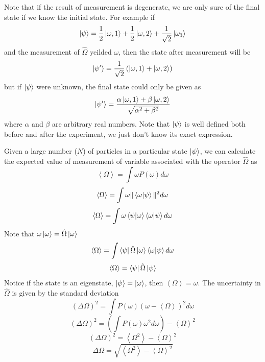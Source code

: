 \documentclass[12pt,a4paper]{report}
\newcommand{\expected}[1]{\left \langle #1 \right \rangle}
\begin{document}
Note that if the result of measurement is degenerate, we are only sure of the final state if we know the initial state. For example if
\begin{equation*}
    \ket{\psi} = \frac{1}{2}\ket{\omega, 1} + \frac{1}{2}\ket{\omega, 2} + \frac{1}{\sqrt{2}}\ket{\omega_3}
\end{equation*}
and the measurement of $\hat{\Omega}$ yeilded $\omega$, then the state after measurement will be
\begin{equation*}
    \ket{\psi'} = \frac{1}{\sqrt{2}}\left(\ket{\omega, 1} + \ket{\omega, 2}\right)
\end{equation*}
but if $\ket{\psi}$ were unknown, the final state could only be given as
\begin{equation*}
    \ket{\psi'} = \frac{\alpha\ket{\omega, 1} + \beta\ket{\omega, 2}}{\sqrt{\alpha^2 + \beta^2}}
\end{equation*}
where $\alpha$ and $\beta$ are arbitrary real numbers. Note that $\ket{\psi}$ is well defined both before and after the experiment, we just don't know its exact expression.

Given a large number ($N$) of particles in a particular state $\ket{\psi}$, we can calculate the expected value of measurement of variable associated with the operator $\hat{\Omega}$ as
\begin{equation*}
    \expected{\Omega} = \int \omega P(\omega) d\omega
\end{equation*}
\begin{equation*}
    \expected{\Omega} = \int \omega \|\bra{\omega}\ket{\psi}\|^2 d\omega
\end{equation*}
\begin{equation*}
    \expected{\Omega} = \int \omega \bra{\psi}\ket{\omega}\bra{\omega}\ket{\psi} d\omega
\end{equation*}
Note that $\omega\ket{\omega} = \hat{\Omega}\ket{\omega}$
\begin{equation*}
    \expected{\Omega} = \int \bra{\psi}\hat{\Omega}\ket{\omega}\bra{\omega}\ket{\psi} d\omega
\end{equation*}
\begin{equation*}
    \expected{\Omega} = \bra{\psi}\hat{\Omega}\ket{\psi}
\end{equation*}
Notice if the state is an eigenstate, $\ket{\psi} = \ket{\omega}$, then $\expected{\Omega} = \omega$. The uncertainty in $\hat{\Omega}$ is given by the standard deviation
\begin{equation*}
    (\Delta\Omega)^2 = \int P(\omega) (\omega - \expected{\Omega})^2 d\omega
\end{equation*}
\begin{equation*}
    (\Delta\Omega)^2 = \left(\int P(\omega) \omega^2 d\omega\right) - \expected{\Omega}^2
\end{equation*}
\begin{equation*}
    (\Delta\Omega)^2 = \expected{\Omega^2} - \expected{\Omega}^2
\end{equation*}
\begin{equation*}
    \Delta\Omega = \sqrt{\expected{\Omega^2} - \expected{\Omega}^2}
\end{equation*}
\end{document}
